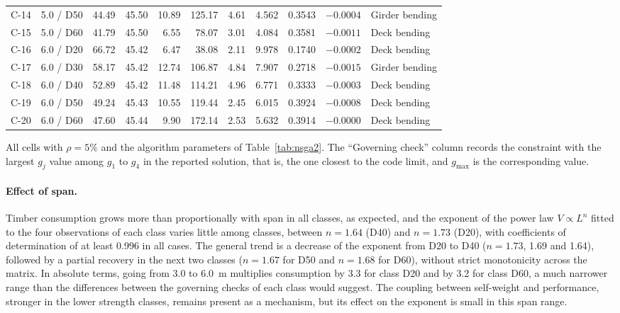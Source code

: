 \begin{table}[!ht]
\begin{threeparttable}
\begin{tabular*}{\textwidth}{@{\extracolsep{\fill}}llrrrrrrrrl@{\extracolsep{\fill}}}
C-14 & 5.0 / D50 & 44.49 & 45.50 & 10.89 & 125.17 & 4.61 & 4.562 & 0.3543 & $-0.0004$ & Girder bending \\
C-15 & 5.0 / D60 & 41.79 & 45.50 & 6.55 & 78.07 & 3.01 & 4.084 & 0.3581 & $-0.0011$ & Deck bending \\
\midrule
C-16 & 6.0 / D20 & 66.72 & 45.42 & 6.47 & 38.08 & 2.11 & 9.978 & 0.1740 & $-0.0002$ & Deck bending \\
C-17 & 6.0 / D30 & 58.17 & 45.42 & 12.74 & 106.87 & 4.84 & 7.907 & 0.2718 & $-0.0015$ & Girder bending \\
C-18 & 6.0 / D40 & 52.89 & 45.42 & 11.48 & 114.21 & 4.96 & 6.771 & 0.3333 & $-0.0003$ & Deck bending \\
C-19 & 6.0 / D50 & 49.24 & 45.43 & 10.55 & 119.44 & 2.45 & 6.015 & 0.3924 & $-0.0008$ & Deck bending \\
C-20 & 6.0 / D60 & 47.60 & 45.44 & 9.90 & 172.14 & 2.53 & 5.632 & 0.3914 & $-0.0000$ & Deck bending \\
\bottomrule
\end{tabular*}
\begin{tablenotes}
\footnotesize
\item All cells with $\rho = 5\%$ and the algorithm parameters of Table~\ref{tab:nsga2}.
The ``Governing check'' column records the constraint with the largest $g_j$ value among $g_1$ to $g_4$ in the reported solution, that is, the one closest to the code limit, and $g_{\max}$ is the corresponding value.
\end{tablenotes}
\end{threeparttable}
\end{table}

\paragraph{Effect of span.} Timber consumption grows more than proportionally with span in all classes, as expected, and the exponent of the power law $V \propto L^{n}$ fitted to the four observations of each class varies little among classes, between $n = 1.64$ (D40) and $n = 1.73$ (D20), with coefficients of determination of at least 0.996 in all cases.
The general trend is a decrease of the exponent from D20 to D40 ($n = 1.73$, 1.69 and 1.64), followed by a partial recovery in the next two classes ($n = 1.67$ for D50 and $n = 1.68$ for D60), without strict monotonicity across the matrix.
In absolute terms, going from 3.0 to 6.0~m multiplies consumption by 3.3 for class D20 and by 3.2 for class D60, a much narrower range than the differences between the governing checks of each class would suggest.
The coupling between self-weight and performance, stronger in the lower strength classes, remains present as a mechanism, but its effect on the exponent is small in this span range.

